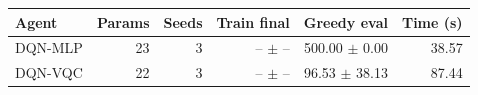 \begin{tabular}{lrrrrr}
\hline
Agent & Params & Seeds & Train final & Greedy eval & Time (s) \\
\hline
DQN-MLP & 23 & 3 & -- $\pm$ -- & 500.00 $\pm$ 0.00 & 38.57 \\
DQN-VQC & 22 & 3 & -- $\pm$ -- & 96.53 $\pm$ 38.13 & 87.44 \\
\hline
\end{tabular}
